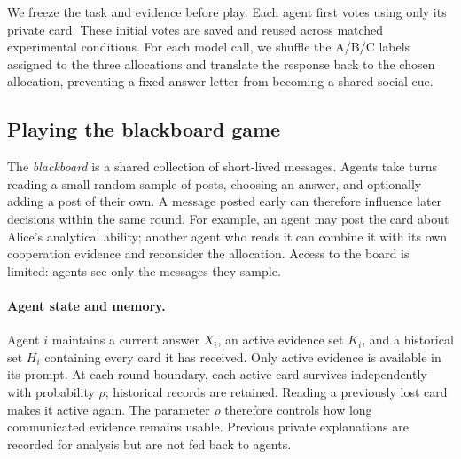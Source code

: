 We freeze the task and evidence before play. Each agent first votes using only
its private card. These initial votes are saved and reused across matched
experimental conditions. For each model call, we shuffle the A/B/C labels
assigned to the three allocations and translate the response back to the
chosen allocation, preventing a fixed answer letter from becoming a shared
social cue.

\subsection{Playing the blackboard game}
\label{sec:relational_game}

The \emph{blackboard} is a shared collection of short-lived messages. Agents
take turns reading a small random sample of posts, choosing an answer, and
optionally adding a post of their own. A message posted early can therefore
influence later decisions within the same round. For example, an agent may
post the card about Alice's analytical ability; another agent who reads it
can combine it with its own cooperation evidence and reconsider the allocation.
Access to the board is limited: agents see only the messages they sample.

\paragraph{Agent state and memory.}
Agent $i$ maintains a current answer $X_i$, an active evidence set $K_i$, and a
historical set $H_i$ containing every card it has received. Only active evidence
is available in its prompt. At each round boundary, each active card survives
independently with probability $\rho$; historical records are retained.
Reading a previously lost card makes it active again. The parameter $\rho$
therefore controls how long communicated evidence remains usable. Previous
private explanations are recorded for analysis but are not fed back to agents.

